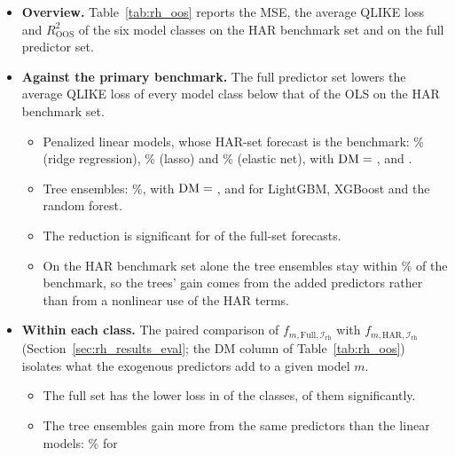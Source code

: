 \begin{itemize}
\item \textbf{Overview.} Table~\ref{tab:rh_oos} reports the MSE, the average QLIKE loss and $R^2_{\mathrm{OOS}}$ of
  the six model classes on the HAR benchmark set and on the full predictor set.
\item \textbf{Against the primary benchmark.} The full predictor set lowers the average QLIKE loss of every model
  class below that of the OLS on the HAR benchmark set.
  \begin{itemize}
  \item Penalized linear models, whose HAR-set forecast is the benchmark: \rhorVsOlsPctRidgeFull\% (ridge regression),
    \rhorVsOlsPctLassoFull\% (lasso) and \rhorVsOlsPctEnetFull\% (elastic net), with $\mathrm{DM}={}$\rhorDmRidgeB,
    \rhorDmLassoB{} and \rhorDmEnetB.
  \item Tree ensembles: \rhorVsOlsRedTreeRng{}\%, with $\mathrm{DM}={}$\rhorVsOlsDmLgbmFull,
    \rhorVsOlsDmXgbFull{} and \rhorVsOlsDmRfFull{} for LightGBM, XGBoost and the random forest.
  \item The reduction is significant for \rhorVsOlsLowerSig{} of the \rhorAfPairs{} full-set forecasts.
  \item On the HAR benchmark set alone the tree ensembles stay within \rhorVsOlsPctTreeHarMaxAbs{}\% of the
    benchmark, so the trees' gain comes from the added predictors rather than from a nonlinear use of the HAR terms.
  \end{itemize}
\item \textbf{Within each class.} The paired comparison of $f_{m,\mathrm{Full},\mathcal I_{\mathrm{rh}}}$ with
  $f_{m,\mathrm{HAR},\mathcal I_{\mathrm{rh}}}$ (Section~\ref{sec:rh_results_eval}; the DM column of
  Table~\ref{tab:rh_oos}) isolates what the exogenous predictors add to a given model $m$.
  \begin{itemize}
  \item The full set has the lower loss in \rhorAfLower{} of the \rhorAfPairs{} classes, \rhorAfLowerSig{} of them
    significantly.
  \item The tree ensembles gain more from the same predictors than the linear models: \rhabLgbmFullAllPct\% for

\end{itemize}
\end{itemize}
